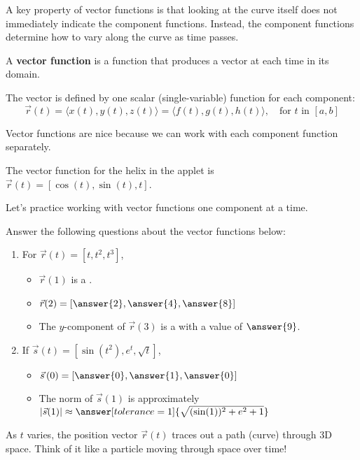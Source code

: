 \documentclass{ximera}
\begin{document}
A key property of vector functions is that looking at the curve itself does not immediately indicate the component functions. Instead, the component functions determine how to vary along the curve as time passes.

\begin{definition}
A \textbf{vector function} is a function that produces a vector at each time in its domain.

The vector is defined by one scalar (single-variable) function for each component:
$$\vec{r}(t) = \langle x(t), y(t), z(t) \rangle = \langle f(t), g(t), h(t) \rangle, \quad \text{for } t \text{ in } [a,b]$$
\end{definition}

\begin{remark}
Vector functions are nice because we can work with each component function separately.
\end{remark}

The vector function for the helix in the applet is $\vec{r}(t) = [ \cos(t), \sin(t), t ]$.

\begin{problem}
Let's practice working with vector functions one component at a time. 

Answer the following questions about the vector functions below: 

\begin{enumerate}
    \item For $\vec{r}(t) = [ t, t^2, t^3 ]$,
    \begin{itemize}
        \item $\vec{r}(1)$ is a .
        \item $\vec{r}(2) =  [ \answer{2}, \answer{4}, \answer{8}]$
        \item The $y$-component of $\vec{r}(3)$ is a  with a value of $\answer{9}$.
    \end{itemize}
    
    \item If $\vec{s}(t) = [ \sin(t^2), e^t, \sqrt{t} ]$,
    \begin{itemize}
        \item $\vec{s}\left(0\right) = [ \answer{0}, \answer{1}, \answer{0} ]$
        \item The norm of $\vec{s}(1)$ is approximately $|\vec{s}(1)| \approx \answer[tolerance=1]{\sqrt{(\sin(1))^2 + e^2 + 1}}$
    \end{itemize}
\end{enumerate}

\begin{feedback}
As $t$ varies, the position vector $\vec{r}(t)$ traces out a path (curve) through 3D space. Think of it like a particle moving through space over time!
\end{feedback}
\end{problem}
\end{document}
